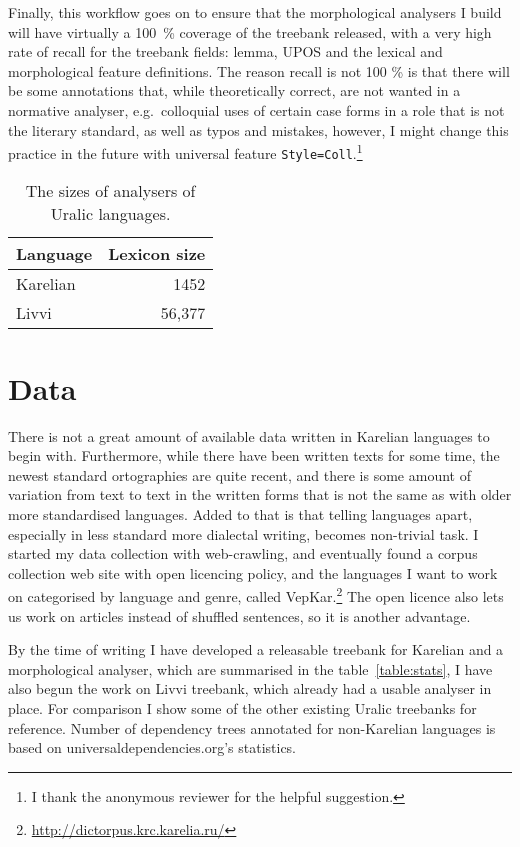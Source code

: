 \documentclass{flammie}
\begin{document}
Finally, this workflow goes on to ensure that the morphological analysers I
build will have virtually a 100~\% coverage of the treebank released, with a
very high rate of recall for the treebank fields: lemma, UPOS and the lexical
and morphological feature definitions. The reason recall is not 100 \% is that
there will be some annotations that, while theoretically correct, are not
wanted in a normative analyser, e.g.\ colloquial uses of certain case forms in
a role that is not the literary standard, as well as typos and mistakes,
however, I might change this practice in the future with universal feature
\texttt{Style=Coll}.\footnote{I thank the anonymous reviewer for the helpful
suggestion.}

\begin{table}
    \begin{centering}
    \begin{tabular}{lr}
        \toprule
        Language & Lexicon size \\
        \midrule
        Karelian & 1452 \\
        Livvi & 56,377 \\
        \bottomrule
    \end{tabular}
    \caption{The sizes of analysers of Uralic languages.\label{table:analysers}}
    \end{centering}
\end{table}

\section{Data}
\label{sec:data}

There is not a great amount of available data written in Karelian languages to
begin with. Furthermore, while there have been written texts for some time, the
newest standard ortographies are quite recent, and there is some amount of
variation from text to text in the written forms that is not the same as with
older more standardised languages. Added to that is that telling languages
apart, especially in less standard more dialectal writing, becomes non-trivial
task. I started my data collection with web-crawling, and eventually found a
corpus collection web site with open licencing policy, and the languages I want
to work on categorised by language and genre, called
VepKar.\footnote{\url{http://dictorpus.krc.karelia.ru/}} The open licence also
lets us work on articles instead of shuffled sentences, so it is another
advantage.

By the time of writing I have developed a releasable treebank for Karelian and
a morphological analyser, which are summarised in the table~\ref{table:stats},
I have also begun the work on Livvi treebank, which already had a usable
analyser in place. For comparison I show some of the other existing Uralic
treebanks for reference. Number of dependency trees annotated for
non-Karelian languages is based on universaldependencies.org's statistics.
\end{document}
